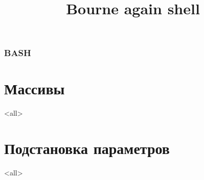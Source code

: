 
\title[bash]{Bourne again shell}




\begin{frame}
	\frametitle{BASH}
	\titlepage
	\vspace{-0.5cm}
	\begin{center}
	\end{center}
\end{frame}

\begin{frame}
	\tableofcontents
\end{frame}



\section{Массивы}

\mode<all>{}

\section{Подстановка параметров}

\mode<all>{}




